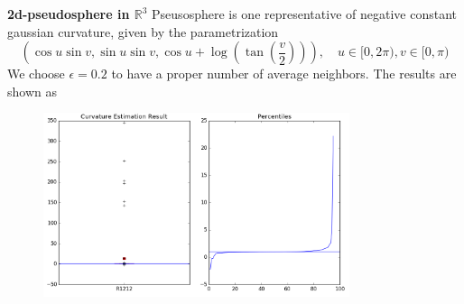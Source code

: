 \documentclass{article}
\begin{document}
\par
\textbf{2d-pseudosphere in $\mathbb{R}^3$} Pseusosphere is one representative of negative constant gaussian curvature, given by the parametrization
\begin{equation}
	(\cos u \sin v, \sin u\sin v, \cos u+\log(\tan(\frac{v}{2}))),\quad u\in[0,2\pi), v\in [0,\pi)
\end{equation}
We choose $\epsilon = 0.2$ to have a proper number of average neighbors. The results are shown as
\begin{figure}[htbp]
\centering
\includegraphics[width=0.8\textwidth]{psphere.png}
\end{figure}


\end{document}
